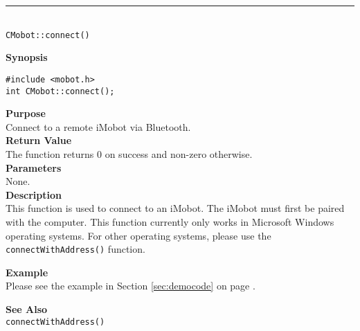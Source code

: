 \noindent
\vspace{5pt}
\rule{4.5in}{0.015in}\\
\noindent
{\LARGE \texttt{CMobot::connect()}}\\
{}

\noindent
{\bf Synopsis}\\
\begin{verbatim}
#include <mobot.h>
int CMobot::connect();
\end{verbatim}

\noindent
{\bf Purpose}\\
Connect to a remote iMobot via Bluetooth.\\

\noindent
{\bf Return Value}\\
The function returns 0 on success and non-zero otherwise.\\

\noindent
{\bf Parameters}\\
None.\\

\noindent
{\bf Description}\\
This function is used to connect to an iMobot. The iMobot must first be paired
with the computer. This function currently only works in Microsoft Windows
operating systems. For other operating systems, please use the
\texttt{connectWithAddress()} function.

\noindent
{\bf Example}\\
Please see the example in Section \ref{sec:democode} on page \pageref{sec:democode}.\\
\noindent

\noindent
{\bf See Also}\\
\texttt{connectWithAddress()}

